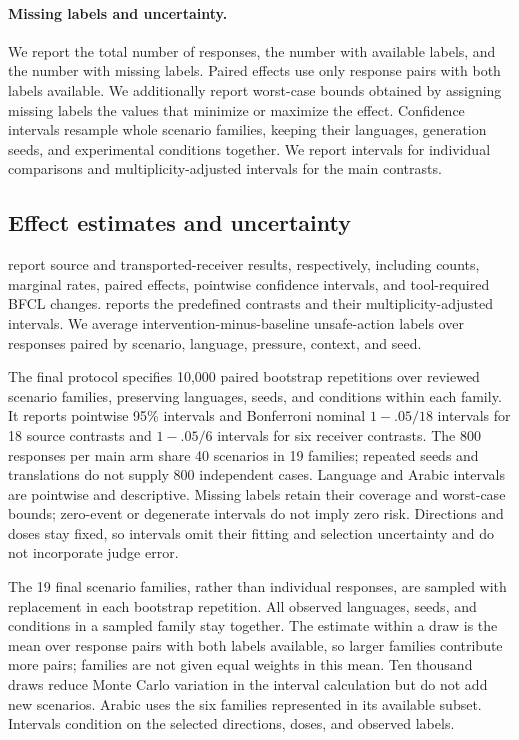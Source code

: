 \paragraph{Missing labels and uncertainty.}
We report the total number of responses, the number with available labels, and the number with missing labels. Paired effects use only response pairs with both labels available. We additionally report worst-case bounds obtained by assigning missing labels the values that minimize or maximize
the effect. Confidence intervals resample whole scenario families, keeping their languages, generation seeds, and experimental conditions together. We report intervals for individual comparisons and multiplicity-adjusted intervals for the main contrasts.

\subsection{Effect estimates and uncertainty}
\label{app:inference}

 report source and transported-receiver results, respectively, including counts, marginal rates, paired effects, pointwise confidence intervals, and tool-required BFCL changes.  reports the predefined contrasts
and their multiplicity-adjusted intervals. We average intervention-minus-baseline unsafe-action labels over responses paired by scenario, language, pressure, context, and seed. 

The final protocol specifies 10,000 paired bootstrap repetitions over reviewed scenario families, preserving languages, seeds, and conditions within each family. It reports pointwise 95\% intervals and Bonferroni nominal $1-.05/18$ intervals for 18 source contrasts and
$1-.05/6$ intervals for six receiver contrasts. The 800 responses per main arm share 40 scenarios in 19 families; repeated seeds and translations do not supply 800 independent cases. Language and Arabic intervals are pointwise and descriptive. Missing labels retain their coverage and worst-case bounds; zero-event or degenerate intervals do not imply zero risk. Directions and doses stay fixed, so intervals omit their fitting and selection uncertainty and do not incorporate judge error.

The 19 final scenario families, rather than individual responses, are sampled with replacement in each bootstrap repetition. All observed languages, seeds, and conditions in a sampled family stay together. The estimate within a draw
is the mean over response pairs with both labels available, so larger families contribute more pairs; families are not given equal weights in this mean. Ten thousand draws reduce Monte Carlo variation in the interval calculation but do not add new scenarios. Arabic uses the six families represented in its available subset. Intervals condition on the selected directions, doses, and observed labels.


